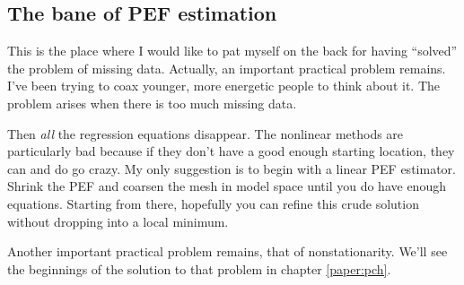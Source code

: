 \subsection{The bane of PEF estimation}
This is the place where I would like to pat myself on the back
for having ``solved'' the problem of missing data.
Actually,
an important practical problem remains.
I've been trying to coax younger,
more energetic people to think about it.
The problem arises when there is too much missing data.
\par
{}
\par\noindent
Then {\em all} the regression equations disappear.
The nonlinear methods are particularly bad
because if they don't have a good enough starting location,
they can and do go crazy.
My only suggestion is to begin with a linear PEF estimator.
Shrink the PEF and
coarsen the mesh in model space
until you do have enough equations.
Starting from there,
hopefully you can refine this crude solution
without dropping into a local minimum.
\par
Another important practical problem remains,
that of nonstationarity.
We'll see the beginnings of the solution
to that problem in chapter \ref{paper:pch}.



